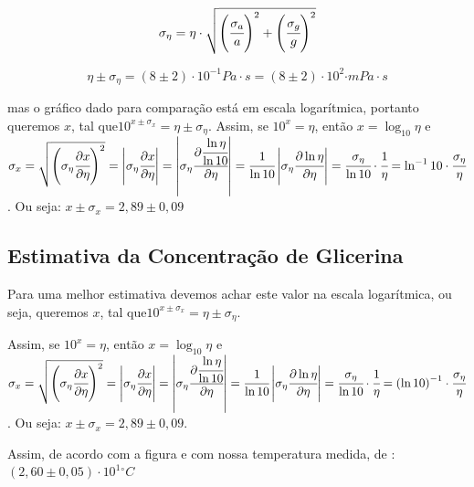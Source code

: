 \documentclass[english,brazil]{article}
\begin{document}
			\begin{equation}
				\sigma_{\eta} = \eta\cdot\sqrt{\left(\cfrac{\sigma_{a}}{a}\right)^{2}+\left(\cfrac{\sigma_{g}}{g}\right)^{2}}
			\end{equation}


			\begin{equation}
				\eta\pm\sigma_{\eta}=\left(8\pm2\right)\cdot10^{-1}\unit{Pa\cdot s=\left(8\pm2\right)\cdot10^{2}\unit{\cdot mPa\cdot s}}
			\end{equation}


			mas o gráfico dado para comparação está em escala logarítmica, portanto
			queremos $x$, tal que$10^{x\pm\sigma_{x}}=\eta\pm\sigma_{\eta}$.
			Assim, se $10^{x}=\eta$, então $x=\log_{10}\eta$ e $\sigma_{x}=\sqrt{\left(\sigma_{\eta}\cfrac{\partial x}{\partial\eta}\right)^{2}}=\left|\sigma_{\eta}\cfrac{\partial x}{\partial\eta}\right|=\left|\sigma_{\eta}\cfrac{\partial\cfrac{\ln\eta}{\ln10}}{\partial\eta}\right|=\cfrac{1}{\ln10}\left|\sigma_{\eta}\cfrac{\partial\ln\eta}{\partial\eta}\right|=\cfrac{\sigma_{\eta}}{\ln10}\cdot\cfrac{1}{\eta}=\ln^{-1}10\cdot\cfrac{\sigma_{\eta}}{\eta}$.
			Ou seja: $x\pm\sigma_{x}=2,89\pm0,09$

		\subsection{Estimativa da Concentração de Glicerina}
		
			Para uma melhor estimativa devemos achar este valor na escala logarítmica, ou seja, queremos $x$, tal que$10^{x\pm\sigma_{x}}=\eta\pm\sigma_{\eta}$.

			Assim, se $10^{x}=\eta$, então $x=\log_{10}\eta$ e $\sigma_{x}=\sqrt{\left(\sigma_{\eta}\cfrac{\partial x}{\partial\eta}\right)^{2}}=\left|\sigma_{\eta}\cfrac{\partial x}{\partial\eta}\right|=\left|\sigma_{\eta}\cfrac{\partial\cfrac{\ln\eta}{\ln10}}{\partial\eta}\right|=\cfrac{1}{\ln10}\left|\sigma_{\eta}\cfrac{\partial\ln\eta}{\partial\eta}\right|=\cfrac{\sigma_{\eta}}{\ln10}\cdot\cfrac{1}{\eta}=\left(\ln10\right)^{-1}\cdot\cfrac{\sigma_{\eta}}{\eta}$.
			Ou seja: $x\pm\sigma_{x}=2,89\pm0,09$.

			Assim, de acordo com a figura e com nossa temperatura medida, de :
			$(2,60\pm0,05)\cdot10^{1}\unit{^{\circ}C}$
\end{document}
